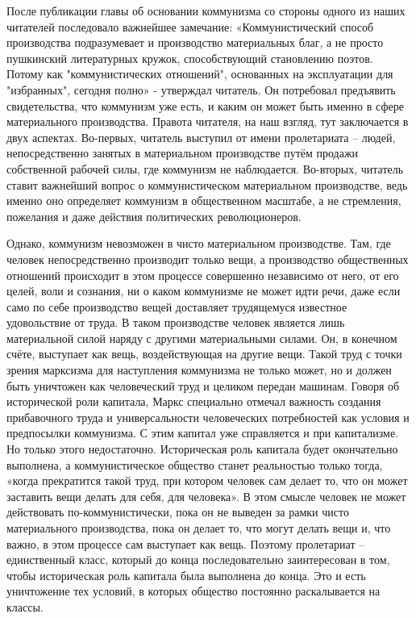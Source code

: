 \documentclass[12pt,a4paper,openany]{book}
\begin{document}
После публикации главы об основании коммунизма со стороны одного из наших читателей последовало важнейшее замечание: «Коммунистический способ производства подразумевает и производство материальных благ, а не просто пушкинский литературных кружок, способствующий становлению поэтов. Потому как "коммунистических отношений", основанных на эксплуатации для "избранных", сегодня полно» - утверждал читатель. Он потребовал предъявить свидетельства, что коммунизм уже есть, и каким он может быть именно в сфере материального производства. Правота читателя, на наш взгляд, тут заключается в двух аспектах. Во-первых, читатель выступил от имени пролетариата – людей, непосредственно занятых в материальном производстве путём продажи собственной рабочей силы, где коммунизм не наблюдается. Во-вторых, читатель ставит важнейший вопрос о коммунистическом материальном производстве, ведь именно оно определяет коммунизм в общественном масштабе, а не стремления, пожелания и даже действия политических революционеров.

Однако, коммунизм невозможен в чисто материальном производстве. Там, где человек непосредственно производит только вещи, а производство общественных отношений происходит в этом процессе совершенно независимо от него, от его целей, воли и сознания, ни о каком коммунизме не может идти речи, даже если само по себе производство вещей доставляет трудящемуся известное удовольствие от труда. В таком производстве человек является лишь материальной силой наряду с другими материальными силами. Он, в конечном счёте, выступает как вещь, воздействующая на другие вещи. Такой труд с точки зрения марксизма для наступления коммунизма не только может, но и должен быть уничтожен как человеческий труд и целиком передан машинам. Говоря об исторической роли капитала, Маркс специально отмечал важность создания прибавочного труда и универсальности человеческих потребностей как условия и предпосылки коммунизма. С этим капитал уже справляется и при капитализме. Но только этого недостаточно. Историческая роль капитала будет окончательно выполнена, а коммунистическое общество станет реальностью только тогда, «когда прекратится такой труд, при котором человек сам делает то, что он может заставить вещи делать для себя, для человека». В этом смысле человек не может действовать по-коммунистически, пока он не выведен за рамки чисто материального производства, пока он делает то, что могут делать вещи и, что важно, в этом процессе сам выступает как вещь. Поэтому пролетариат – единственный класс, который до конца последовательно заинтересован в том, чтобы историческая роль капитала была выполнена до конца. Это и есть уничтожение тех условий, в которых общество постоянно раскалывается на классы.
\end{document}
